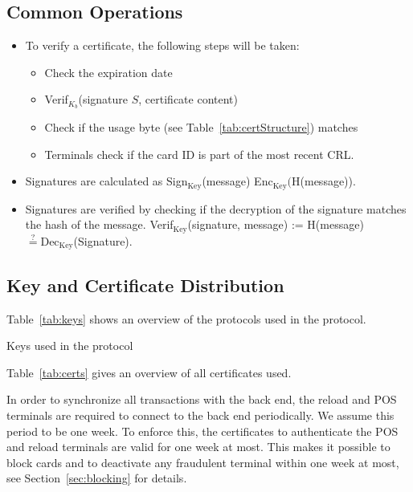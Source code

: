 \documentclass{article}
\begin{document}
\subsection{Common Operations}
\begin{itemize}
    \item To verify a certificate, the following steps will be taken:
        \begin{itemize}
            \item Check the expiration date
            \item Verif$_{K_b}$(signature $S$, certificate content)
            \item Check if the usage byte (see Table~\ref{tab:certStructure}) matches
            \item Terminals check if the card ID is part of the most recent CRL\@.
        \end{itemize}

    \item Signatures are calculated as Sign$_{\textrm{Key}}$(message) \coloneqq \textrm{Enc}$_{\textrm{Key}}($H(message)).

    \item Signatures are verified by checking if the decryption of the signature matches the hash of the message.
    Verif$_{\textrm{Key}}$(signature, message) := H(message) $\stackrel{?}{=} \textrm{Dec}_{\textrm{Key}}$(Signature).
\end{itemize}

\subsection{Key and Certificate Distribution}

Table~\ref{tab:keys} shows an overview of the protocols used in the protocol.
\begin{table}[h]
    \centering
    
    \caption{Keys used in the protocol}
    \label{tab:keys}
\end{table}

Table~\ref{tab:certs} gives an overview of all certificates used.

In order to synchronize all transactions with the back end, the reload and POS terminals are required to connect to the back end periodically.
We assume this period to be one week.
To enforce this, the certificates to authenticate the POS and reload terminals are valid for one week at most.
This makes it possible to block cards and to deactivate any fraudulent terminal within one week at most, see Section~\ref{sec:blocking} for details.
\end{document}
